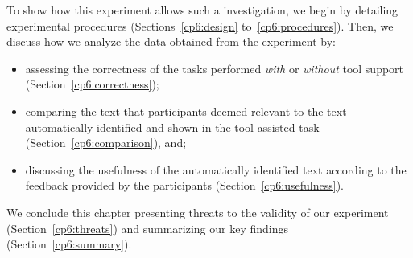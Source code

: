 To show how this experiment allows such a investigation, we begin by detailing
experimental procedures (Sections~\ref{cp6:design} to~\ref{cp6:procedures}).
Then, we discuss how we analyze the data obtained from the experiment by:


\begin{itemize}
    \item assessing the correctness of the tasks performed \textit{with} or \textit{without} tool support (Section~\ref{cp6:correctness});
    \item comparing  the text that participants deemed relevant to the text automatically identified
    and shown in the tool-assisted task (Section~\ref{cp6:comparison}), and;
    \item discussing the usefulness of the automatically identified text according to the feedback provided by the participants (Section~\ref{cp6:usefulness}).
\end{itemize}
 
We conclude this chapter presenting threats to the validity of our experiment (Section~\ref{cp6:threats}) and 
 summarizing our key findings (Section~\ref{cp6:summary}).


 
 
 
 
 


 
 
 
 
 
 





























